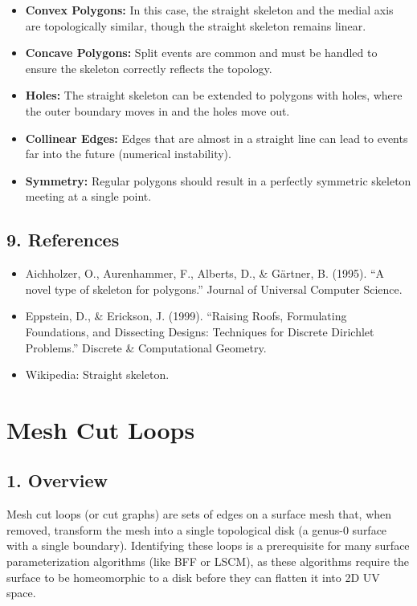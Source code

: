 \begin{itemize}
    \item \textbf{Convex Polygons:} In this case, the straight skeleton and the medial axis are topologically similar, though the straight skeleton remains linear.
    \item \textbf{Concave Polygons:} Split events are common and must be handled to ensure the skeleton correctly reflects the topology.
    \item \textbf{Holes:} The straight skeleton can be extended to polygons with holes, where the outer boundary moves in and the holes move out.
    \item \textbf{Collinear Edges:} Edges that are almost in a straight line can lead to events far into the future (numerical instability).
    \item \textbf{Symmetry:} Regular polygons should result in a perfectly symmetric skeleton meeting at a single point.
\end{itemize}

\subsection{9. References}

\begin{itemize}
    \item Aichholzer, O., Aurenhammer, F., Alberts, D., \& G\"{a}rtner, B. (1995). ``A novel type of skeleton for polygons.'' Journal of Universal Computer Science.
    \item Eppstein, D., \& Erickson, J. (1999). ``Raising Roofs, Formulating Foundations, and Dissecting Designs: Techniques for Discrete Dirichlet Problems.'' Discrete \& Computational Geometry.
    \item Wikipedia: Straight skeleton.
\end{itemize}

\section{Mesh Cut Loops}
\label{sec:mesh_cut_loops}

\subsection{1. Overview}

Mesh cut loops (or cut graphs) are sets of edges on a surface mesh that, when removed, transform the mesh into a single topological disk (a genus-0 surface with a single boundary). Identifying these loops is a prerequisite for many surface parameterization algorithms (like BFF\cite{crane2017} or LSCM), as these algorithms require the surface to be homeomorphic to a disk before they can flatten it into 2D UV space.

